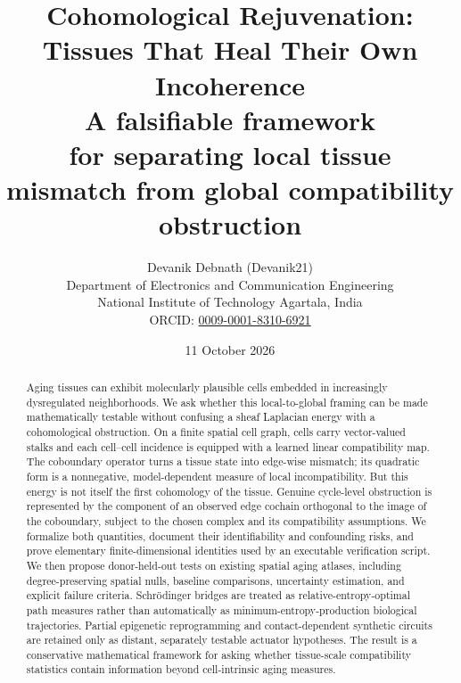 \documentclass[11pt]{article}
\title{\textbf{Cohomological Rejuvenation: Tissues That Heal Their Own Incoherence}\\[0.35em]\large A falsifiable framework\\for separating local tissue mismatch from global compatibility obstruction}
\author{Devanik Debnath (Devanik21)\\\small Department of Electronics and Communication Engineering\\\small National Institute of Technology Agartala, India\\\small ORCID: \href{https://orcid.org/0009-0001-8310-6921}{0009-0001-8310-6921}}
\date{11 October 2026}
\begin{document}
\maketitle
\begin{center}
\end{center}
\begin{abstract}
Aging tissues can exhibit molecularly plausible cells embedded in increasingly dysregulated neighborhoods. We ask whether this local-to-global framing can be made mathematically testable without confusing a sheaf Laplacian energy with a cohomological obstruction. On a finite spatial cell graph, cells carry vector-valued stalks and each cell--cell incidence is equipped with a learned linear compatibility map. The coboundary operator turns a tissue state into edge-wise mismatch; its quadratic form is a nonnegative, model-dependent measure of local incompatibility. But this energy is not itself the first cohomology of the tissue. Genuine cycle-level obstruction is represented by the component of an observed edge cochain orthogonal to the image of the coboundary, subject to the chosen complex and its compatibility assumptions. We formalize both quantities, document their identifiability and confounding risks, and prove elementary finite-dimensional identities used by an executable verification script. We then propose donor-held-out tests on existing spatial aging atlases, including degree-preserving spatial nulls, baseline comparisons, uncertainty estimation, and explicit failure criteria. Schr\"odinger bridges are treated as relative-entropy-optimal path measures rather than automatically as minimum-entropy-production biological trajectories. Partial epigenetic reprogramming and contact-dependent synthetic circuits are retained only as distant, separately testable actuator hypotheses. The result is a conservative mathematical framework for asking whether tissue-scale compatibility statistics contain information beyond cell-intrinsic aging measures.
\end{abstract}
\end{document}
